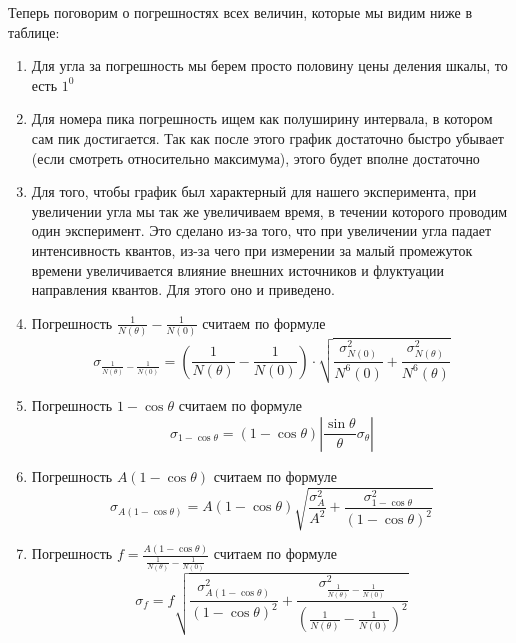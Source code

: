 \documentclass[a4paper, 12pt]{article}%
\begin{document}
Теперь поговорим о погрешностях всех величин, которые мы видим ниже в таблице:
\begin{enumerate}
\item Для угла за погрешность мы берем просто половину цены деления шкалы, то есть $1 ^0$
\item Для номера пика погрешность ищем как полуширину интервала, в котором сам пик достигается. Так как после этого график достаточно быстро убывает (если смотреть относительно максимума), этого будет вполне достаточно
\item Для того, чтобы график был характерный для нашего эксперимента, при увеличении угла мы так же увеличиваем время, в течении которого проводим один эксперимент. Это сделано из-за того, что при увеличении угла падает интенсивность квантов, из-за чего при измерении за малый промежуток времени увеличивается влияние внешних источников и флуктуации направления квантов. Для этого оно и приведено.
\item Погрешность $\frac{1}{N(\theta)} - \frac{1}{N(0)}$ считаем по формуле
\[\sigma_{\frac{1}{N(\theta)} - \frac{1}{N(0)}} = \left(\frac{1}{N(\theta)} - \frac{1}{N(0)}\right) \cdot \sqrt{\frac{\sigma^2_{N(0)}}{N^6(0)} + \frac{\sigma^2_{N(\theta)}}{N^6(\theta)}}\]
\item Погрешность $1-\cos \theta$ считаем по формуле
\[\sigma_{1-\cos\theta} = \left(1-\cos\theta\right) \left| \frac{\sin\theta}{\theta} \sigma_{\theta}\right|\]
\item Погрешность $A(1-\cos\theta)$ считаем по формуле
\[\sigma_{A(1-\cos\theta)} = A(1-\cos\theta)\sqrt{\frac{\sigma^2_A}{A^2} + \frac{\sigma^2_{1-\cos\theta}}{(1-\cos\theta)^2}}\]
\item Погрешность $f = \frac{A(1-\cos\theta)}{\frac{1}{N(\theta)} - \frac{1}{N(0)}}$ считаем по формуле
\[\sigma_f = f \sqrt{\frac{\sigma_{A(1-\cos\theta)}^2}{(1-\cos\theta)^2} + \frac{\sigma_{\frac{1}{N(\theta)} - \frac{1}{N(0)}}^2}{\left(\frac{1}{N(\theta)} - \frac{1}{N(0)}\right)^2}}\]
\end{enumerate}
\end{document}
